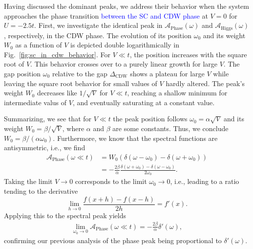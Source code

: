 \documentclass[
    reprint, 
    aps,
    preprintnumbers,
    twocolumn,
    prb,
    superscriptaddress
]{revtex4-2}
\newcommand{\spectral}[1]{\mathcal{A}_\text{#1}  (\omega)}
\newcommand{\bs}{\begin{subequations}}
\newcommand{\es}{\end{subequations}}
\newcommand{\blue}[1]{\textcolor{blue}{#1}}
\begin{document}
Having discussed the dominant peaks, we address their behavior when 
the system approaches the phase transition \blue{between the SC and CDW phase} at $V=0$ for $U=-2.5t$.
First, we investigate the identical peak in $\spectral{Phase}$ and $\spectral{Higgs}$, respectively, in the CDW phase.
The evolution of its position $\omega_0$ and its weight $W_0$ as a function of $V$ is depicted
double logarithmically in Fig.\ \ref{fig:sc_in_cdw_behavior}.
For $V \ll t$, the position increases with the square root of $V$. 
This behavior crosses over to a purely linear growth for large $V$.
The gap position $\omega_0$ relative to the gap $\Delta_\text{CDW}$ shows a plateau for large $V$ 
while leaving the square root behavior for small values of $V$ hardly altered.
The peak's weight $W_0$ decreases like $1/\sqrt{V}$ for $V \ll t$,
reaching a shallow minimum for intermediate valus of $V$, and 
eventually saturating at a constant value.

Summarizing, we see that for $V \ll t$ the peak position follows 
$\omega_0 = \alpha \sqrt{V}$ and its weight  $W_0 = \beta / \sqrt{V}$, 
where $\alpha$ and $\beta$ are some constants. Thus, we conclude $W_0 = \beta / (\alpha \omega_0)$. 
Furthermore, we know that the spectral functions are antisymmetric, i.e., we find
\bs
\begin{align}
    \mathcal{A}_\text{Phase} (\omega \ll t) &= W_0 (\delta (\omega - \omega_0) - \delta (\omega + \omega_0)) 
		\\
    &= - \frac{2\beta}{\alpha} \frac{\delta (\omega + \omega_0) - \delta (\omega - \omega_0)}{2\omega_0}.
\end{align} 
\es
Taking the limit $V \to 0$ corresponds to the limit $\omega_0 \to 0$, i.e., leading to a ratio tending to the
derivative
\begin{equation}
    \lim_{h \to 0} \frac{f(x + h) - f(x - h)}{2h} = f'(x).
\end{equation}
Applying this to the spectral peak yields
\begin{align}
    \lim_{\omega_0 \to 0} \mathcal{A}_\text{Phase} (\omega \ll t) = - \frac{2 \beta}{\alpha} \delta'(\omega),
\end{align}
confirming our previous analysis of the phase peak being proportional to  $\delta' (\omega)$.

\end{document}
